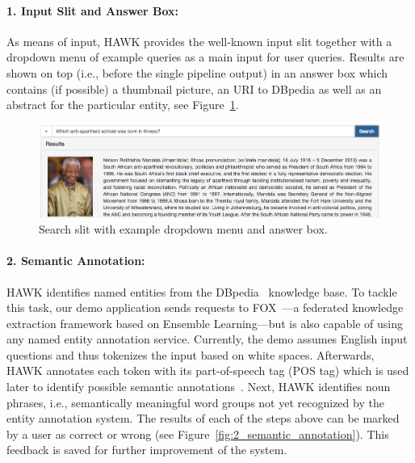 \documentclass{llncs}
\begin{document}
\paragraph{\textbf{1. Input Slit and Answer Box}:}
As means of input, HAWK provides the well-known input slit together with a dropdown menu of example queries as a main input for user queries.
Results are shown on top (i.e., before the single pipeline output) in an answer box which contains (if possible) a thumbnail picture, an URI to DBpedia as well as an abstract for the particular entity, see Figure~\ref{fig:1_input}.

\begin{figure}[htb!]
\centering
\includegraphics[width=\linewidth]{1_input}
\caption{Search slit with example dropdown menu and answer box.}
\label{fig:1_input}
\end{figure}

\paragraph{\textbf{2. Semantic Annotation}:} 
HAWK identifies named entities from the DBpedia~\cite{jl_2014/swj_dbpedia} knowledge base.
To tackle this task, our demo application sends requests to FOX~\cite{FOX}---a federated knowledge extraction framework based on Ensemble Learning---but is also capable of using any named entity annotation service.
Currently, the demo assumes English input questions and thus tokenizes the input based on white spaces.
Afterwards, HAWK annotates each token with its part-of-speech tag (POS tag) which is used later to identify possible semantic annotations~\cite{choi2011getting}. 
Next, HAWK identifies noun phrases, i.e., semantically meaningful word groups not yet recognized by the entity annotation system. %
The results of each of the steps above can be marked by a user as correct or wrong (see Figure~\ref{fig:2_semantic_annotation}). This feedback is saved for further improvement of the  system. 
\end{document}
